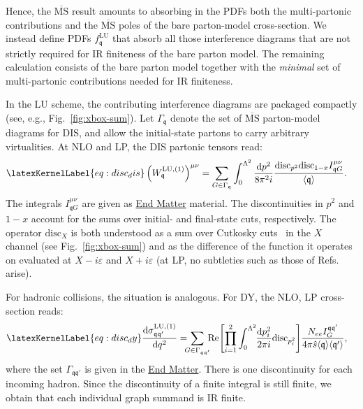 \documentclass[%
 reprint,
 amsmath,amssymb,
 superscriptaddress,
 aps,
 preprintnumbers,
prl,
floatfix,
]{revtex4-2}
\let\label\latexKernelLabel
\begin{document}
Hence, the $\overline{\text{MS}}$ result amounts to absorbing in the PDFs both the multi-partonic contributions and the $\overline{\text{MS}}$ poles of the bare parton-model cross-section.
We instead define PDFs $f_{\mathfrak{q}}^{\text{LU}}$ that absorb all those interference diagrams that are not strictly required for IR finiteness of the bare parton model.
The remaining calculation consists of the bare parton model together with the \emph{minimal} set of multi-partonic contributions needed for IR finiteness.

In the LU scheme, the contributing interference diagrams are packaged compactly (see, e.g., Fig.~\ref{fig:xbox-sum}).
Let $\Gamma_{\mathfrak{q}}$ denote the set of $\overline{\text{MS}}$ parton-model diagrams for DIS, and allow the initial-state partons to carry arbitrary virtualities.
At NLO and LP, the DIS partonic tensors read:
\begin{align}
\label{eq:disc_dis}
\left(W_{\mathfrak{q}}^{\text{LU},(1)}\right)^{\mu\nu}&=\sum_{G\in\Gamma_{\mathfrak{q}}}\int_0^{\Lambda^2} \frac{\mathrm{d}p^2}{8\pi^2 i}\frac{\text{disc}_{p^2}\text{disc}_{1-x}I_{\mathfrak{q} G}^{\mu\nu}}{\langle\mathfrak{q}\rangle}.
\end{align}
 The integrals $I_{\mathfrak{q} G}^{\mu\nu}$ are given as \hyperref[sec:integrals_DIS_DY]{End Matter} material.
 The discontinuities in $p^2$ and $1-x$ account for the sums over initial- and final-state cuts, respectively.
 The operator $\text{disc}_{X}$ is both understood as a sum over Cutkosky cuts~\cite{Cutkosky:1960sp} in the $X$ channel (see Fig.~\ref{fig:xbox-sum}) and as the difference of the function it operates on evaluated at $X-i\varepsilon$ and $X+i\varepsilon$ (at LP, no subtleties such as those of Refs.~\cite{Bourjaily:2020wvq,Hannesdottir:2022xki,Abreu:2014cla,Abreu:2017enx} arise).

For hadronic collisions, the situation is analogous.
For DY, the NLO, LP cross-section reads:
\begin{align}
\label{eq:disc_dy}
\frac{\mathrm{d}\sigma_{\mathfrak{q}\mathfrak{q}'}^{\text{LU},(1)}}{\mathrm{d}q^2}&= \hspace{-0.2cm}\sum_{G\in\Gamma_{\mathfrak{q}\mathfrak{q}'}} \hspace{-0.15cm} \text{Re}\hspace{-0.05cm}\left[\prod_{i=1}^2\int_0^{\Lambda^2}\hspace{-0.1cm}\frac{\mathrm{d}p_i^2}{2\pi i}\text{disc}_{p_i^2}\right] \! \frac{N_{ee}I_{ G}^{\mathfrak{q}\mathfrak{q}'}}{4\pi \hat{s}\langle\mathfrak{q}\rangle \langle\mathfrak{q}'\rangle},
\end{align}
where the set $\Gamma_{\mathfrak{q}\mathfrak{q}'}$ is given in the \hyperref[sec:integrals_DIS_DY]{End Matter}.
There is one discontinuity for each incoming hadron. Since the discontinuity of a finite integral is still finite, we obtain that each individual graph summand is IR finite.
\end{document}
